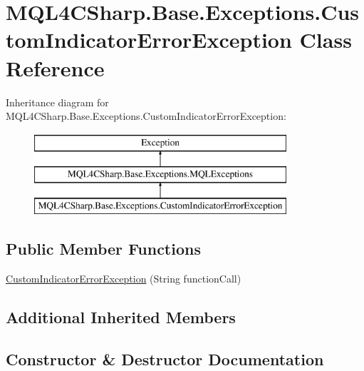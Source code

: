 \hypertarget{class_m_q_l4_c_sharp_1_1_base_1_1_exceptions_1_1_custom_indicator_error_exception}{}\section{M\+Q\+L4\+C\+Sharp.\+Base.\+Exceptions.\+Custom\+Indicator\+Error\+Exception Class Reference}
\label{class_m_q_l4_c_sharp_1_1_base_1_1_exceptions_1_1_custom_indicator_error_exception}
Inheritance diagram for M\+Q\+L4\+C\+Sharp.\+Base.\+Exceptions.\+Custom\+Indicator\+Error\+Exception\+:\begin{figure}[H]
\begin{center}
\leavevmode
\includegraphics[height=3.000000cm]{class_m_q_l4_c_sharp_1_1_base_1_1_exceptions_1_1_custom_indicator_error_exception}
\end{center}
\end{figure}
\subsection*{Public Member Functions}
\begin{DoxyCompactItemize}
\item 
\hyperlink{class_m_q_l4_c_sharp_1_1_base_1_1_exceptions_1_1_custom_indicator_error_exception_ab947253e5e371e6c44f795ad8eb48ffb}{Custom\+Indicator\+Error\+Exception} (String function\+Call)
\end{DoxyCompactItemize}
\subsection*{Additional Inherited Members}


\subsection{Constructor \& Destructor Documentation}
